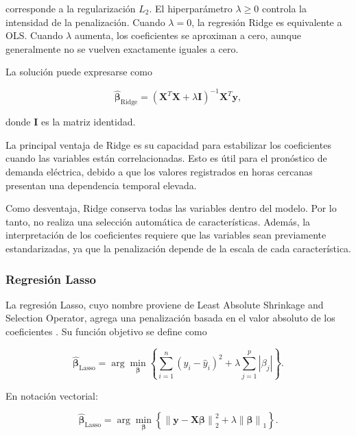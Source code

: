 corresponde a la regularización $L_2$. El hiperparámetro $\lambda\geq 0$ controla la intensidad de la penalización. Cuando $\lambda=0$, la regresión Ridge es equivalente a OLS. Cuando $\lambda$ aumenta, los coeficientes se aproximan a cero, aunque generalmente no se vuelven exactamente iguales a cero.

La solución puede expresarse como

\begin{equation}
    \hat{\boldsymbol{\beta}}_{\mathrm{Ridge}}
    =
    \left(
        \mathbf{X}^{T}\mathbf{X}
        +
        \lambda\mathbf{I}
    \right)^{-1}
    \mathbf{X}^{T}\mathbf{y},
\end{equation}

donde $\mathbf{I}$ es la matriz identidad.

La principal ventaja de Ridge es su capacidad para estabilizar los coeficientes cuando las variables están correlacionadas. Esto es útil para el pronóstico de demanda eléctrica, debido a que los valores registrados en horas cercanas presentan una dependencia temporal elevada.

Como desventaja, Ridge conserva todas las variables dentro del modelo. Por lo tanto, no realiza una selección automática de características. Además, la interpretación de los coeficientes requiere que las variables sean previamente estandarizadas, ya que la penalización depende de la escala de cada característica.

\subsubsection{Regresión Lasso}
\label{sec:lasso}

La regresión Lasso, cuyo nombre proviene de Least Absolute Shrinkage and Selection Operator, agrega una penalización basada en el valor absoluto de los coeficientes \cite{tibshirani1996lasso}. Su función objetivo se define como

\begin{equation}
    \hat{\boldsymbol{\beta}}_{\mathrm{Lasso}}
    =
    \arg\min_{\boldsymbol{\beta}}
    \left\{
        \sum_{i=1}^{n}
        \left(
            y_i-\hat{y}_i
        \right)^2
        +
        \lambda
        \sum_{j=1}^{p}
        \left|
            \beta_j
        \right|
    \right\}.
\end{equation}

En notación vectorial:

\begin{equation}
    \hat{\boldsymbol{\beta}}_{\mathrm{Lasso}}
    =
    \arg\min_{\boldsymbol{\beta}}
    \left\{
        \left\|
            \mathbf{y}-\mathbf{X}\boldsymbol{\beta}
        \right\|_2^2
        +
        \lambda
        \left\|
            \boldsymbol{\beta}
        \right\|_1
    \right\}.
\end{equation}

